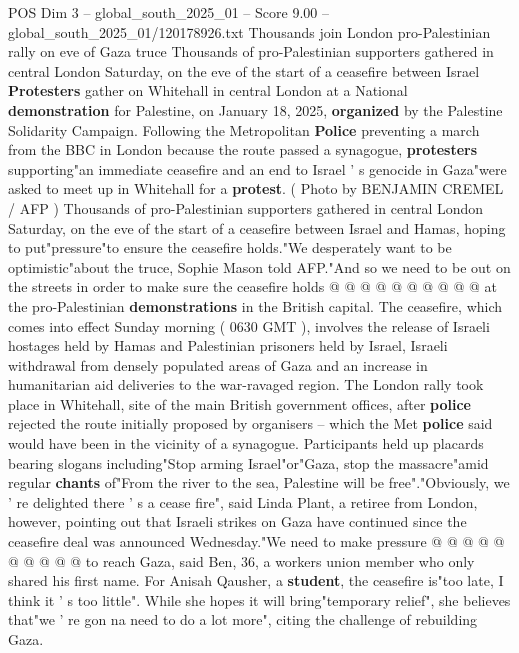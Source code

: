 \begin{textsample}{POS Dim 3 – global\_south\_2025\_01 – Score 9.00 – global\_south\_2025\_01/120178926.txt}  \label{ex:f3_pos_384}
Thousands join London pro-Palestinian rally on eve of Gaza truce Thousands of pro-Palestinian supporters gathered in central London Saturday, on the eve of the start of a ceasefire between Israel \textbf{Protesters} gather on Whitehall in central London at a National \textbf{demonstration} for Palestine, on January 18, 2025, \textbf{organized} by the Palestine Solidarity Campaign.
Following the Metropolitan \textbf{Police} preventing a march from the BBC in London because the route passed a synagogue, \textbf{protesters} supporting"an immediate ceasefire and an end to Israel ' s genocide in Gaza"were asked to meet up in Whitehall for a \textbf{protest}. ( Photo by BENJAMIN CREMEL / AFP ) Thousands of pro-Palestinian supporters gathered in central London Saturday, on the eve of the start of a ceasefire between Israel and Hamas, hoping to put"pressure"to ensure the ceasefire holds."We desperately want to be optimistic"about the truce, Sophie Mason told AFP."And so we need to be out on the streets in order to make sure the ceasefire holds @ @ @ @ @ @ @ @ @ @ at the pro-Palestinian \textbf{demonstrations} in the British capital.
The ceasefire, which comes into effect Sunday morning ( 0630 GMT ), involves the release of Israeli hostages held by Hamas and Palestinian prisoners held by Israel, Israeli withdrawal from densely populated areas of Gaza and an increase in humanitarian aid deliveries to the war-ravaged region.
The London rally took place in Whitehall, site of the main British government offices, after \textbf{police} rejected the route initially proposed by organisers -- which the Met \textbf{police} said would have been in the vicinity of a synagogue.
Participants held up placards bearing slogans including"Stop arming Israel"or"Gaza, stop the massacre"amid regular \textbf{chants} of"From the river to the sea, Palestine will be free"."Obviously, we ' re delighted there ' s a cease fire", said Linda Plant, a retiree from London, however, pointing out that Israeli strikes on Gaza have continued since the ceasefire deal was announced Wednesday."We need to make pressure @ @ @ @ @ @ @ @ @ @ to reach Gaza, said Ben, 36, a workers union member who only shared his first name.
For Anisah Qausher, a \textbf{student}, the ceasefire is"too late, I think it ' s too little".
While she hopes it will bring"temporary relief", she believes that"we ' re gon na need to do a lot more", citing the challenge of rebuilding Gaza.

\end{textsample}
